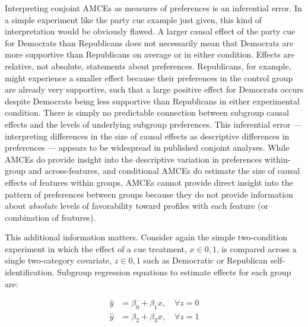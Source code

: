 \documentclass[a4paper,12pt]{article}\usepackage[]{graphicx}\usepackage[]{color}
\begin{document}
Interpreting conjoint AMCEs as measures of preferences is an inferential error. In a simple experiment like the party cue example just given, this kind of interpretation would be obviously flawed. A larger causal effect of the party cue for Democrats than Republicans does not necessarily mean that Democrats are more supportive than Republicans on average or in either condition. Effects are relative, not absolute, statements about preferences. Republicans, for example, might experience a smaller effect because their preferences in the control group are already very supportive, such that a large positive effect for Democrats occurs despite Democrats being less supportive than Republicans in either experimental condition. There is simply no predictable connection between subgroup causal effects and the levels of underlying subgroup preferences. This inferential error --- interpreting differences in the size of causal effects as descriptive differences in preferences --- appears to be widespread in published conjoint analyses. While AMCEs do provide insight into the descriptive variation in preferences within-group and across-features, and conditional AMCEs do estimate the size of causal effects of features within groups, AMCEs cannot provide direct insight into the pattern of preferences between groups because they do not provide information about \textit{absolute} levels of favorability toward profiles with each feature (or combination of features).

This additional information matters. Consider again the simple two-condition experiment in which the effect of a cue treatment, $x \in {0,1}$, is compared across a single two-category covariate, $z \in {0,1}$ such as Democratic or Republican self-identification. Subgroup regression equations to estimate effects for each group are:

\begin{align*}
\hat{y} &= \beta_0 + \beta_1 x, \quad \forall z = 0 \\
\hat{y} &= \beta_2 + \beta_3 x, \quad \forall z = 1
\end{align*}
\end{document}
